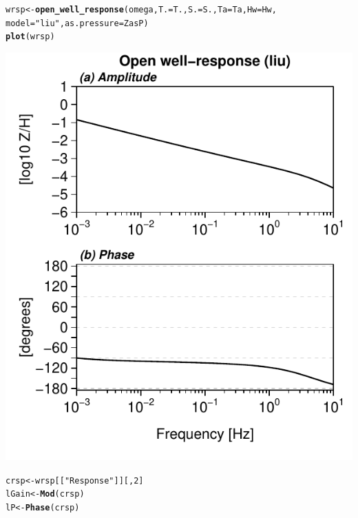\documentclass[12pt]{article}\usepackage[]{graphicx}\usepackage[]{color}
\makeatletter
\def\maxwidth{ %
  \ifdim\Gin@nat@width>\linewidth
    \linewidth
  \else
    \Gin@nat@width
  \fi
}
\newcommand{\hlnum}[1]{\textcolor[rgb]{0.686,0.059,0.569}{#1}}%
\newcommand{\hlstr}[1]{\textcolor[rgb]{0.192,0.494,0.8}{#1}}%
\newcommand{\hlstd}[1]{\textcolor[rgb]{0.345,0.345,0.345}{#1}}%
\newcommand{\hlkwb}[1]{\textcolor[rgb]{0.69,0.353,0.396}{#1}}%
\newcommand{\hlkwc}[1]{\textcolor[rgb]{0.333,0.667,0.333}{#1}}%
\newcommand{\hlkwd}[1]{\textcolor[rgb]{0.737,0.353,0.396}{\textbf{#1}}}%
\newenvironment{kframe}{%
 \def\at@end@of@kframe{}%
 \ifinner\ifhmode%
  \def\at@end@of@kframe{\end{minipage}}%
  \begin{minipage}{\columnwidth}%
 \fi\fi%
 \def\FrameCommand##1{\hskip\@totalleftmargin \hskip-\fboxsep
 \colorbox{shadecolor}{##1}\hskip-\fboxsep
     \hskip-\linewidth \hskip-\@totalleftmargin \hskip\columnwidth}%
 \MakeFramed {\advance\hsize-\width
   \@totalleftmargin\z@ \linewidth\hsize
   \@setminipage}}%
 {\par\unskip\endMakeFramed%
 \at@end@of@kframe}
\newenvironment{knitrout}{}{} %
\makeatother
\begin{document}
\begin{knitrout}\small
{}\color{fgcolor}\begin{kframe}
\begin{alltt}
\hlstd{wrsp} \hlkwb{<-} \hlkwd{open_well_response}\hlstd{(omega,} \hlkwc{T.} \hlstd{= T.,} \hlkwc{S.} \hlstd{= S.,} \hlkwc{Ta} \hlstd{= Ta,} \hlkwc{Hw} \hlstd{= Hw,}
    \hlkwc{model} \hlstd{=} \hlstr{"liu"}\hlstd{,} \hlkwc{as.pressure} \hlstd{= ZasP)}
\hlkwd{plot}\hlstd{(wrsp)}
\end{alltt}
\end{kframe}
\includegraphics[width=\maxwidth]{figure/LIURESP} 
\begin{kframe}\begin{alltt}
\hlstd{crsp} \hlkwb{<-} \hlstd{wrsp[[}\hlstr{"Response"}\hlstd{]][,} \hlnum{2}\hlstd{]}
\hlstd{lGain} \hlkwb{<-} \hlkwd{Mod}\hlstd{(crsp)}
\hlstd{lP} \hlkwb{<-} \hlkwd{Phase}\hlstd{(crsp)}
\end{alltt}
\end{kframe}
\end{knitrout}
\end{document}
